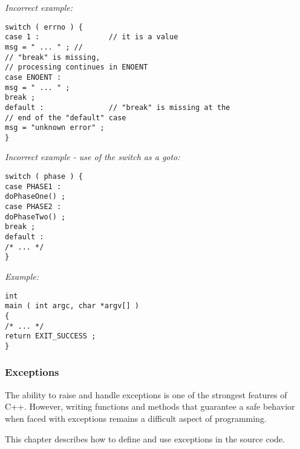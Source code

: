 \emph{Incorrect example:}
\begin{lstlisting}[frame=TBRL]
switch ( errno ) {
case 1 :                // it is a value
msg = " ... " ; //
// "break" is missing,
// processing continues in ENOENT
case ENOENT :
msg = " ... " ;
break ;
default :               // "break" is missing at the
// end of the "default" case
msg = "unknown error" ;
}
\end{lstlisting}

\emph{Incorrect example - use of the switch as a goto:}
\begin{lstlisting}[frame=TBRL]
switch ( phase ) {
case PHASE1 :
doPhaseOne() ;
case PHASE2 :
doPhaseTwo() ;
break ;
default :
/* ... */
}
\end{lstlisting}

\emph{Example:}
\lstset{language=C++, basicstyle=\normalsize}
\begin{lstlisting}[frame=TBRL]
int
main ( int argc, char *argv[] )
{
/* ... */
return EXIT_SUCCESS ;
}
\end{lstlisting}

\subsubsection{Exceptions}

The ability to raise and handle exceptions is one of the strongest features of C++. However, writing functions and methods that guarantee a safe behavior when faced with exceptions remains a difficult aspect of programming.

This chapter describes how to define and use exceptions in the source code.


